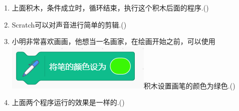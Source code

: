 \documentclass[10pt, a4paper]{article}
\begin{document}
\begin{enumerate}
        \item 上面积木，条件成立时，循环结束，执行这个积木后面的程序.(\qquad)
                
        \item Scratch可以对声音进行简单的剪辑.(\qquad)
        
        \item  小明非常喜欢画画，他想当一名画家，在绘画开始之前，可以使用\includegraphics[width=.2\textwidth]{34.png}积木设置画笔的颜色为绿色.(\qquad)
        
        \item 上面两个程序运行的效果是一样的.(\qquad)
    \end{enumerate}
\end{document}
